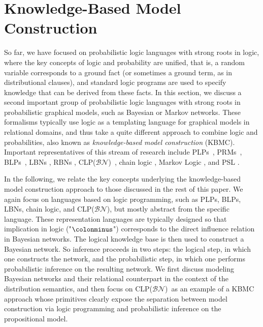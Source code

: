 \documentclass[a4paper]{article}
\newcommand{\clpbn}
  {CLP($\mathcal{BN}$)}
\begin{document}
\section{Knowledge-Based Model Construction}
\label{sec:kbmc-bg}
So far, we have focused on probabilistic logic languages with strong
roots in logic, where the key concepts of logic
and probability are unified, that is, a random variable corresponds to
a ground fact (or sometimes a ground term, as in distributional clauses),
and standard logic programs are used to specify knowledge that can be
derived from these facts. In this section, we discuss a second
important group of probabilistic logic languages with 
strong roots in probabilistic graphical models, such as Bayesian or
Markov networks. These formalisms typically use logic as a templating
language for graphical models in relational domains, and thus take a
quite different approach to combine logic and probabilities, also known as
\emph{knowledge-based model construction} (KBMC). Important
representatives of this stream of research include PLPs~\citep{Haddawy:94}, PRMs~\citep{getoor},
BLPs~\citep{Kersting08}, LBNs \citep{fierens:ilp05}, RBNs
\citep{Jaeger97},  \clpbn~\citep{clpbn}, chain logic
\citep{HommersomLucasECML09}, Markov Logic
\citep{Richardson:06}, and PSL \citep{broecheler:uai10}.  



In the following, we relate the key concepts underlying the
knowledge-based model construction approach to those discussed in the
rest of this paper. We again focus on languages based on logic
programming, such as PLPs, BLPs, LBNs, chain logic, and \clpbn, but mostly abstract from the specific language. These representation languages are typically designed so that 
implication in logic ("$\colonminus$") corresponds to the direct influence relation 
in Bayesian networks.  The logical knowledge base is then used
to construct a Bayesian network.  So inference proceeds in two steps: 
the logical step, in which one constructs the network, and the 
probabilistic step, in which one performs probabilistic inference on
the resulting network. We first discuss modeling Bayesian networks and their
relational counterpart in the context of the distribution semantics,
and then focus on \clpbn\ as an example of a KBMC approach whose
primitives clearly expose the separation between model
construction via logic programming and probabilistic inference on the
propositional model. 
\end{document}
